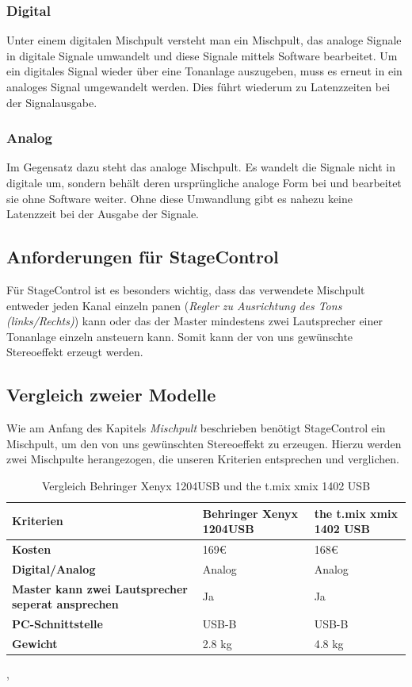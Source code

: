 \subsubsection{Digital}
Unter einem digitalen Mischpult versteht man ein Mischpult, das analoge Signale in digitale Signale umwandelt und diese Signale mittels Software bearbeitet. Um ein digitales Signal wieder über eine Tonanlage auszugeben, muss es erneut in ein analoges Signal umgewandelt werden. Dies führt wiederum zu Latenzzeiten bei der Signalausgabe.
\subsubsection{Analog}
Im Gegensatz dazu steht das analoge Mischpult. Es wandelt die Signale nicht in digitale um, sondern behält deren ursprüngliche analoge Form bei und bearbeitet sie ohne Software weiter. Ohne diese Umwandlung gibt es nahezu keine Latenzzeit bei der Ausgabe der Signale. \\
\cite{Mischpult_Analog/Digital}

\subsection{Anforderungen für StageControl}
Für StageControl ist es besonders wichtig, dass das verwendete Mischpult entweder jeden Kanal einzeln panen (\emph{Regler zu Ausrichtung des Tons (links/Rechts)}) kann oder das der Master mindestens zwei Lautsprecher einer Tonanlage einzeln ansteuern kann. Somit kann der von uns gewünschte Stereoeffekt erzeugt werden.

\subsection{Vergleich zweier Modelle}
Wie am Anfang des Kapitels \emph{Mischpult} beschrieben benötigt StageControl ein Mischpult, um den von uns gewünschten Stereoeffekt zu erzeugen. Hierzu werden zwei Mischpulte herangezogen, die unseren Kriterien entsprechen und  verglichen.

\begin{table} [H]
	\begin{tabular}{ |p{3.1cm} |p{4.8cm}|p{4.8cm}| }
		\hline
		\textbf{Kriterien} & \textbf{Behringer Xenyx 1204USB}& \textbf{the t.mix xmix 1402 USB}\\
		\hline
		\textbf{Kosten} & 169€ & 168€  \\ 
		\hline
		\textbf{Digital/Analog} & Analog & Analog   \\  
		\hline
		\textbf{Master kann zwei Lautsprecher seperat ansprechen} & Ja & Ja \\
		\hline
		\textbf{PC-Schnittstelle} & USB-B & USB-B  \\
		\hline
		\textbf{Gewicht}& 2.8 kg & 4.8 kg \\
		\hline	
	\end{tabular}
	\caption{Vergleich Behringer Xenyx 1204USB und the t.mix xmix 1402 USB} 
\end{table} 
\cite{Mischpult_Kriterien_1204}, \cite{Mischpult_Kriterien_1402}

